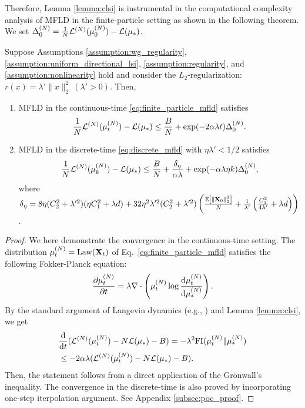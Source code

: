 Therefore, Lemma \ref{lemma:clsi} is instrumental in the computational complexity analysis of MFLD in the finite-particle setting as shown in the following theorem. 
We set $\pow[\Delta_0,N] = \frac{1}{N}\pow[\cL,N](\pow[\mu,N]_0) - \cL(\mu_*)$.
\begin{theorem}\label{theorem:mfld_convergence}
    Suppose Assumptions \ref{assumption:wg_regularity}, \ref{assumption:uniform_directional_lsi},  \ref{assumption:regularity}, and \ref{assumption:nonlinearity} hold and consider the $L_2$-regularization: $r(x)=\lambda' \|x\|_2^2~(\lambda'>0)$. Then, 
    \begin{enumerate}[itemsep=0mm,leftmargin=5mm,topsep=0mm] 
        \item MFLD in the continuous-time \eqref{eq:finite_particle_mfld} satisfies
        \[ 
        \frac{1}{N}\pow[\cL,N](\pow[\mu,N]_t) - \cL(\mu_*) 
        \leq \frac{B}{N} + \exp(-2\alpha \lambda t) \pow[\Delta,N]_0.
        \]
        \item MFLD in the discrete-time \eqref{eq:discrete_mfld} with $\eta \lambda' < 1/2$ satisfies
        \[ 
        \frac{1}{N}\pow[\cL,N](\pow[\mu,N]_k) - \cL(\mu_*) 
        \leq \frac{B}{N} + \frac{ \delta_{\eta}}{\alpha\lambda} 
        + \exp( -\alpha\lambda\eta k )\pow[\Delta,N]_0, \]
        where $\delta_\eta =  8\eta( C_2^2 + \lambda^{\prime 2}) (\eta C_1^2 + \lambda d) 
        +  32 \eta^2 \lambda'^2( C_2^2 + \lambda^{\prime 2}) \left( \frac{\mathbb{E}\left[ \left\| \mathbf{X}_0 \right\|_2^2 \right]}{N} + \frac{1}{\lambda'}\left(\frac{C_1^2}{4\lambda'} + \lambda d\right) \right)$. %
    \end{enumerate}
\end{theorem}
\begin{proof}
    We here demonstrate the convergence in the continuous-time setting.
    The distribution $\pow[\mu,N]_t=\mathrm{Law}(\vX_t)$ of Eq.~\eqref{eq:finite_particle_mfld} satisfies the following Fokker-Planck equation:
    \[ \frac{\partial \pow[\mu,N]_t}{\partial t} 
    = \lambda \nabla\cdot \left( \pow[\mu,N]_t \log \frac{\rd \pow[\mu,N]_t}{\rd \pow[\mu,N]_*}\right). \]
    By the standard argument of Langevin dynamics (e.g., \citet{vempala2019rapid}) and Lemma \ref{lemma:clsi}, we get
    \begin{align*}
        &\frac{\rd}{\rd t}(\pow[\cL,N](\pow[\mu,N]_t) - N\cL(\mu_*) - B)
        = -\lambda^2 \FI(\pow[\mu,N]_t \| \pow[\mu,N]_*) \\
        &\leq -2 \alpha \lambda (\pow[\cL,N](\pow[\mu,N]_t) - N\cL(\mu_*) - B).
    \end{align*}
    Then, the statement follows from a direct application of the Gr\"{o}nwall’s inequality. 
    The convergence in the discrete-time is also proved by incorporating one-step iterpolation argument. See Appendix \ref{subsec:poc_proof}.
\end{proof}

